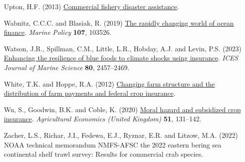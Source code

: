 \documentclass[
  letterpaper,
  DIV=11,
  numbers=noendperiod]{scrartcl}
\newlength{\cslhangindent}
\newlength{\cslentryspacingunit} %
\newenvironment{CSLReferences}[2] %
 {%
  \setlength{\parindent}{0pt}
  \ifodd #1
  \let\oldpar\par
  \def\par{\hangindent=\cslhangindent\oldpar}
  \fi
  \setlength{\parskip}{#2\cslentryspacingunit}
 }%
 {}
\theoremstyle{plain}
\theoremstyle{plain}
\theoremstyle{remark}
\begin{document}
\begin{CSLReferences}{1}{0}
\leavevmode{}%
Upton, H.F. (2013) \href{https://www.crs.gov}{Commercial fishery
disaster assistance}.

\leavevmode{}%
Wabnitz, C.C.C. and Blasiak, R. (2019)
\href{https://doi.org/10.1016/j.marpol.2019.103526}{The rapidly changing
world of ocean finance}. \emph{Marine Policy} \textbf{107}, 103526.

\leavevmode{}%
Watson, J.R., Spillman, C.M., Little, L.R., Hobday, A.J. and Levin, P.S.
(2023) \href{https://doi.org/10.1093/icesjms/fsad175}{Enhancing the
resilience of blue foods to climate shocks using insurance}. \emph{ICES
Journal of Marine Science} \textbf{80}, 2457--2469.

\leavevmode{}%
White, T.K. and Hoppe, R.A. (2012)
\href{https://www.ers.usda.gov}{Changing farm structure and the
distribution of farm payments and federal crop insurance}.

\leavevmode{}%
Wu, S., Goodwin, B.K. and Coble, K. (2020)
\href{https://doi.org/10.1111/agec.12545}{Moral hazard and subsidized
crop insurance}. \emph{Agricultural Economics (United Kingdom)}
\textbf{51}, 131--142.

\leavevmode{}%
Zacher, L.S., Richar, J.I., Fedewa, E.J., Ryznar, E.R. and Litzow, M.A.
(2022) NOAA technical memorandum NMFS-AFSC the 2022 eastern bering sea
continental shelf trawl survey: Results for commercial crab species.

\end{CSLReferences}
\end{document}
